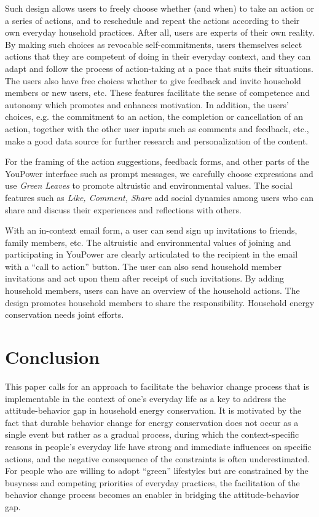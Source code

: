 \documentclass[a4paper]{article}
\begin{document}
Such design allows users to freely choose whether (and when) to take an action or a series of actions, and to reschedule and repeat the actions according to their own everyday household practices. After all, users are experts of their own reality. By making such choices as revocable self-commitments, users themselves select actions that they are competent of doing in their everyday context, and they can adapt and follow the process of action-taking at a pace that suits their situations. The users also have free choices whether to give feedback and invite household members or new users, etc. These features facilitate the sense of competence and autonomy which promotes and enhances motivation. In addition, the users' choices, e.g. the commitment to an action, the completion or cancellation of an action, together with the other user inputs such as comments and feedback, etc., make a good data source for further research and personalization of the content. 

For the framing of the action suggestions, feedback forms, and other parts of the YouPower interface such as prompt messages, we carefully choose expressions and use \textit{Green Leaves} to promote altruistic and environmental values. The social features such as \textit{Like, Comment, Share} add social dynamics among users who can share and discuss their experiences and reflections with others. 

With an in-context email form, a user can send sign up invitations to friends, family members, etc. The altruistic and environmental values of joining and participating in YouPower are clearly articulated to the recipient in the email with a ``call to action'' \citep{Crumlish2009} button. The user can also send household member invitations and act upon them after receipt of such invitations. By adding household members, users can have an overview of the household actions. The design promotes household members to share the responsibility. Household energy conservation needs joint efforts. 

\section{Conclusion}
\label{sec:conclusion}

This paper calls for an approach to facilitate the behavior change process that is implementable in the context of one's everyday life as a key to address the attitude-behavior gap in household energy conservation. It is motivated by the fact that durable behavior change for energy conservation does not occur as a single event but rather as a gradual process, during which the context-specific reasons in people's everyday life have strong and immediate influences on specific actions, and the negative consequence of the constraints is often underestimated. For people who are willing to adopt ``green'' lifestyles but are constrained by the busyness and competing priorities of everyday practices, the facilitation of the behavior change process becomes an enabler in bridging the attitude-behavior gap. 
\end{document}

